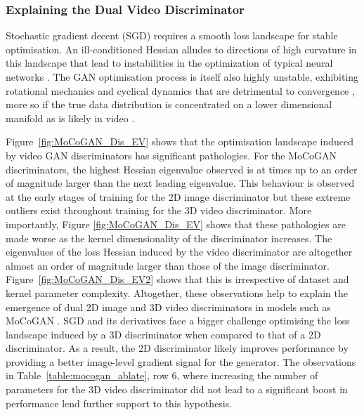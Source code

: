 \documentclass[a4paper,fleqn]{cas-sc}
\begin{document}
\subsubsection{Explaining the Dual Video Discriminator}
\label{sec:dvd_explain}
Stochastic gradient decent (SGD) requires a smooth loss landscape for stable optimisation. An ill-conditioned Hessian alludes to directions of high curvature in this landscape that lead to instabilities in the optimization of typical neural networks \cite{saarinen1993ill, Martens_HessFree}. The GAN optimisation process is itself also highly unstable, exhibiting rotational mechanics and cyclical dynamics that are detrimental to convergence \cite{balduzzi18aMechanics}, more so if the true data distribution is concentrated on a lower dimensional manifold as is likely in video \cite{Nagarajan17_StableGD,mescheder18aConverge}. 

Figure~\ref{fig:MoCoGAN_Dis_EV} shows that the optimisation landscape induced by video GAN discriminators has significant pathologies. For the MoCoGAN discriminators, the highest Hessian eigenvalue observed is at times up to an order of magnitude larger than the next leading eigenvalue. This behaviour is observed at the early stages of training for the 2D image discriminator but these extreme outliers exist throughout training for the 3D video discriminator. More importantly, Figure \ref{fig:MoCoGAN_Dis_EV} shows that these pathologies are made worse as the kernel dimensionality of the discriminator increases. The eigenvalues of the loss Hessian induced by the video discriminator are altogether almost an order of magnitude larger than those of the image discriminator.  Figure~\ref{fig:MoCoGAN_Dis_EV2} shows that this is irrespective of dataset and kernel parameter complexity. 
Altogether, these observations help to explain the emergence of dual 2D image and 3D video discriminators in models such as MoCoGAN \cite{Tulyakov0YK18mocogan}. SGD and its derivatives face a bigger challenge optimising the loss landscape induced by a 3D discriminator when compared to that of a 2D discriminator. As a result, the 2D discriminator likely improves performance by providing a better image-level gradient signal for the generator. The observations in Table~\ref{table:mocogan_ablate}, row 6, where increasing the number of parameters for the 3D video discriminator did not lead to a significant boost in performance lend further support to this hypothesis. 
\end{document}
